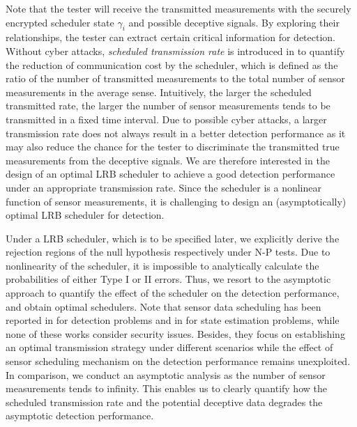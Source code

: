 \documentclass[journal]{IEEEtran}
\begin{document}
Note that the tester will receive the transmitted measurements with the securely encrypted scheduler state $\gamma_i$ and possible deceptive signals. By exploring their relationships, the tester can extract certain critical information for detection. Without cyber attacks, {\em scheduled transmission rate} is introduced in \cite{you2013asymptotically} to quantify the reduction of communication cost by the scheduler, which is defined as the ratio of the number of transmitted measurements to the total number of sensor measurements in the average sense. Intuitively, the larger the scheduled transmitted rate, the larger the number of sensor measurements tends to be transmitted in a fixed time interval. Due to possible cyber attacks, a larger transmission rate does not always result in a better detection performance as it may also reduce the chance for the tester to discriminate the transmitted true measurements from the deceptive signals. We are therefore interested in the design of an optimal LRB scheduler to achieve a good detection performance under an appropriate transmission rate.  Since the scheduler is a nonlinear function of sensor measurements, it is challenging to design an (asymptotically) optimal LRB scheduler for detection.





Under a LRB scheduler, which is to be specified later, we explicitly derive the rejection regions of the null hypothesis respectively under N-P tests. Due to nonlinearity of the scheduler, it is impossible to analytically calculate the probabilities of either Type I or II errors. Thus, we resort to the asymptotic approach  to quantify the effect of the scheduler on the detection performance, and obtain optimal schedulers.  Note that sensor data scheduling  has been reported in \cite{rago1996censoring,appadwedula2005energy,appadwedula2008decentralized,maleki2011energy,ding2014likelihood} for detection problems and in \cite{shi2011optimal,shi2011sensor,wu2013event,you2013asymptotically} for state estimation problems, while none of these works consider security issues. Besides, they focus on establishing an optimal transmission strategy under different scenarios while the effect of sensor scheduling mechanism on the detection performance remains unexploited. In comparison, we conduct an asymptotic analysis as the number of sensor measurements tends to infinity. This enables us to clearly quantify how the scheduled transmission rate and the potential deceptive data degrades the asymptotic detection performance.
\end{document}
